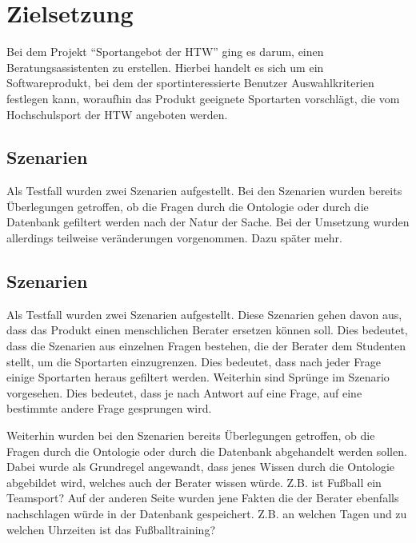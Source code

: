 \chapter{Zielsetzung}
Bei dem Projekt "`Sportangebot der HTW"' ging es darum, einen Beratungsassistenten zu erstellen. Hierbei handelt es sich um ein Softwareprodukt, bei dem der sportinteressierte Benutzer Auswahlkriterien festlegen kann, woraufhin das Produkt geeignete Sportarten vorschlägt, die vom Hochschulsport der HTW angeboten werden.

\section{Szenarien}

Als Testfall wurden zwei Szenarien aufgestellt. Bei den Szenarien wurden bereits Überlegungen getroffen, ob die Fragen durch die Ontologie oder durch die Datenbank gefiltert werden nach der Natur der Sache. Bei der Umsetzung wurden allerdings teilweise veränderungen vorgenommen. Dazu später mehr.



\section{Szenarien}

Als Testfall wurden zwei Szenarien aufgestellt. Diese Szenarien gehen davon aus, dass das Produkt einen menschlichen Berater ersetzen können soll. Dies bedeutet, dass die Szenarien aus einzelnen Fragen bestehen, die der Berater dem Studenten stellt, um die Sportarten einzugrenzen. Dies bedeutet, dass nach jeder Frage einige Sportarten heraus gefiltert werden. Weiterhin sind Sprünge im Szenario vorgesehen. Dies bedeutet, dass je nach Antwort auf eine Frage, auf eine bestimmte andere Frage gesprungen wird.

Weiterhin wurden bei den Szenarien bereits Überlegungen getroffen, ob die Fragen durch die Ontologie oder durch die Datenbank abgehandelt werden sollen. Dabei wurde als Grundregel angewandt, dass jenes Wissen durch die Ontologie abgebildet wird, welches auch der Berater wissen würde. Z.B. ist Fußball ein Teamsport? Auf der anderen Seite wurden jene Fakten die der Berater ebenfalls nachschlagen würde in der Datenbank gespeichert. Z.B. an welchen Tagen und zu welchen Uhrzeiten ist das Fußballtraining?

